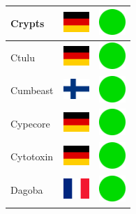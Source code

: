 \documentclass[12pt, a4paper, twoside]{report}
\begin{document}
\begin{center}
\begin{longtable}{|p{5cm}|p{2cm}|p{2cm}|}
Crypts & \includegraphics[width=1cm]{4x3/de} & \includegraphics[width=1cm]{likes/y} \\ \hline
Ctulu & \includegraphics[width=1cm]{4x3/de} & \includegraphics[width=1cm]{likes/y} \\ \hline
Cumbeast & \includegraphics[width=1cm]{4x3/fi} & \includegraphics[width=1cm]{likes/y} \\ \hline
Cypecore & \includegraphics[width=1cm]{4x3/de} & \includegraphics[width=1cm]{likes/y} \\ \hline
Cytotoxin & \includegraphics[width=1cm]{4x3/de} & \includegraphics[width=1cm]{likes/y} \\ \hline
Dagoba & \includegraphics[width=1cm]{4x3/fr} & \includegraphics[width=1cm]{likes/y} \\ \hline

\end{longtable}
\end{center}
\end{document}

